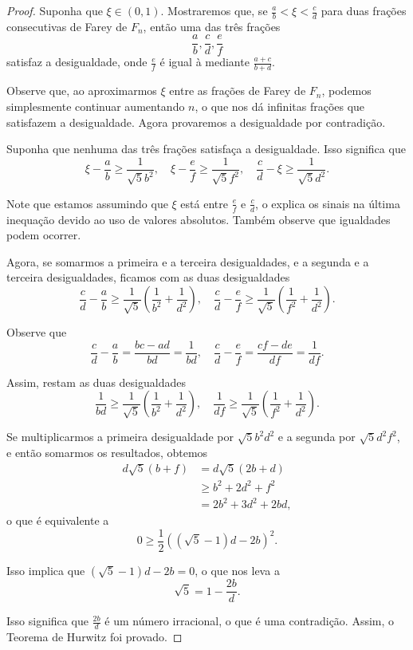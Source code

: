 \documentclass{hipatia}
\theoremstyle{definition} %
\begin{document}
\begin{proof}
Suponha que \(\xi \in (0,1)\). Mostraremos que, se \(\frac{a}{b} < \xi < \frac{c}{d}\) para duas frações consecutivas de Farey de \(F_n\), então uma das três frações
\[
\frac{a}{b}, \frac{c}{d}, \frac{e}{f}
\]
satisfaz a desigualdade, onde \(\frac{e}{f}\) é igual à mediante \(\frac{a+c}{b+d}\).

Observe que, ao aproximarmos \(\xi\) entre as frações de Farey de \(F_n\), podemos simplesmente continuar aumentando \(n\), o que nos dá infinitas frações que satisfazem a desigualdade. Agora provaremos a desigualdade por contradição.

Suponha que nenhuma das três frações satisfaça a desigualdade. Isso significa que
\[
\xi - \frac{a}{b} \geq \frac{1}{\sqrt{5}b^2}, \quad \xi - \frac{e}{f} \geq \frac{1}{\sqrt{5}f^2}, \quad \frac{c}{d} - \xi \geq \frac{1}{\sqrt{5}d^2}.
\]

Note que estamos assumindo que \(\xi\) está entre \(\frac{e}{f}\) e \(\frac{c}{d}\), o explica os sinais na última inequação devido ao uso de valores absolutos. Também observe que igualdades podem ocorrer.

Agora, se somarmos a primeira e a terceira desigualdades, e a segunda e a terceira desigualdades, ficamos com as duas desigualdades
\[
\frac{c}{d} - \frac{a}{b} \geq \frac{1}{\sqrt{5}} \left( \frac{1}{b^2} + \frac{1}{d^2} \right), \quad \frac{c}{d} - \frac{e}{f} \geq \frac{1}{\sqrt{5}} \left( \frac{1}{f^2} + \frac{1}{d^2} \right).
\]

Observe que
\[
\frac{c}{d} - \frac{a}{b} = \frac{bc - ad}{bd} = \frac{1}{bd}, \quad \frac{c}{d} - \frac{e}{f} = \frac{cf - de}{df} = \frac{1}{df}.
\]

Assim, restam as duas desigualdades
\[
\frac{1}{bd} \geq \frac{1}{\sqrt{5}} \left( \frac{1}{b^2} + \frac{1}{d^2} \right), \quad \frac{1}{df} \geq \frac{1}{\sqrt{5}} \left( \frac{1}{f^2} + \frac{1}{d^2} \right).
\]

Se multiplicarmos a primeira desigualdade por \(\sqrt{5}b^2d^2\) e a segunda por \(\sqrt{5}d^2f^2\), e então somarmos os resultados, obtemos
\begin{align*}
d\sqrt{5}(b + f) &= d\sqrt{5}(2b + d) \\
 &\geq b^2 + 2d^2 + f^2 \\
 &= 2b^2 + 3d^2 + 2bd,
\end{align*}
o que é equivalente a
\[
0 \geq \frac{1}{2} ((\sqrt{5} - 1)d - 2b)^2.
\]

Isso implica que \((\sqrt{5} - 1)d - 2b = 0\), o que nos leva a
\[
\sqrt{5} = 1 - \frac{2b}{d}.
\]

Isso significa que \(\frac{2b}{d}\) é um número irracional, o que é uma contradição. Assim, o Teorema de Hurwitz foi provado.
\end{proof}
\end{document}
